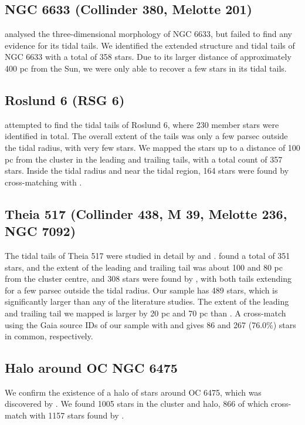 \documentclass{aa}
\begin{document}
\subsection{NGC 6633 (Collinder 380, Melotte 201)}
\citet{2022ApJ...931..156Pang} analysed the three-dimensional morphology of NGC 6633, but failed to find any evidence for its tidal tails. We identified the extended structure and tidal tails of NGC 6633 with a total of 358 stars. Due to its larger distance of approximately 400 pc from the Sun, we were only able to recover a few stars in its tidal tails. 


\subsection{Roslund 6 (RSG 6)}
\citet{10.1093/mnras/stac2906} attempted to find the tidal tails of Roslund 6, where 230 member stars were identified in total. The overall extent of the tails was only a few parsec outside the tidal radius, with very few stars. We mapped the stars up to a distance of 100 pc from the cluster in the leading and trailing tails, with a total count of 357 stars. Inside the tidal radius and near the tidal region, 164 stars were found by cross-matching with \citet{10.1093/mnras/stac2906}. 


\subsection{Theia 517 (Collinder 438, M 39, Melotte 236, NGC 7092)} 
The tidal tails of Theia 517 were studied in detail by \citet{2021A&A...645A..84Meingast} and \citet{10.1093/mnras/stac2906}. \citet{2021A&A...645A..84Meingast} found a total of 351 stars, and the extent of the leading and trailing tail was about 100 and 80 pc from the cluster centre, and 308 stars were found by \citet{10.1093/mnras/stac2906}, with both tails extending for a few parsec outside the tidal radius. Our sample has 489 stars, which is significantly larger than any of the literature studies. The extent of the leading and trailing tail we mapped is larger by 20 pc and 70 pc than \citet{2021A&A...645A..84Meingast}. A cross-match using the Gaia source IDs of our sample with \citet{10.1093/mnras/stac2906} and \citet{2021A&A...645A..84Meingast} gives 86 and 267 (76.0\%) stars in common, respectively. 



\subsection{Halo around OC NGC 6475 }
We confirm the existence of a halo of stars around OC 6475, which was discovered by \citet{2022ApJ...931..156Pang}. We found 1005 stars in the cluster and halo, 866 of which cross-match with 1157 stars found by \citet{2022ApJ...931..156Pang}.
\end{document}

